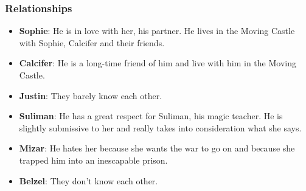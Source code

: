 




\subsubsection*{Relationships}
\begin{itemize}
\item \textbf{Sophie}: He is in love with her, his partner. He lives in the Moving Castle with Sophie, Calcifer and their friends.
\item \textbf{Calcifer}: He is a long-time friend of him and live with him in the Moving Castle.
\item \textbf{Justin}: They barely know each other.
\item \textbf{Suliman}: He has a great respect for Suliman, his magic teacher. He is slightly submissive to her and really takes into consideration what she says.
\item \textbf{Mizar}: He hates her because she wants the war to go on and because she trapped him into an inescapable prison.
\item \textbf{Belzel}: They don't know each other.
\end{itemize}


